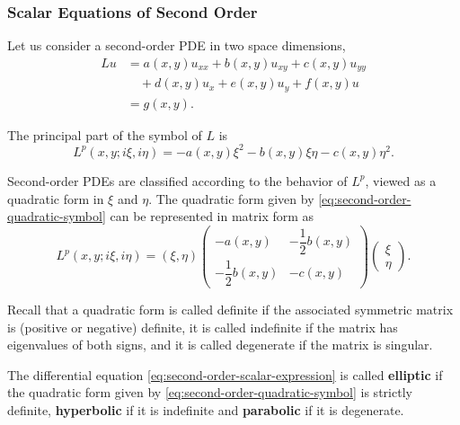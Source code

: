 \subsubsection{Scalar Equations of Second Order}\label{subsec:second-order-scalar-equations}

Let us consider a second-order PDE in two space dimensions,
\begin{equation}\label{eq:second-order-scalar-expression}
\begin{aligned}
Lu&=a(x,y)u_{xx}+b(x,y)u_{xy}+c(x,y)u_{yy}\\
&\quad+d(x,y)u_x+e(x,y)u_y+f(x,y)u\\
&=g(x,y).
\end{aligned}
\end{equation}


The principal part of the symbol of $L$ is
\begin{equation}\label{eq:second-order-quadratic-symbol}
L^p(x,y;i\xi,i\eta)=-a(x,y)\xi^2-b(x,y)\xi\eta-c(x,y)\eta^2.
\end{equation}


Second-order PDEs are classified according to the behavior of $L^p$, viewed as a quadratic form in $\xi$ and $\eta$. The quadratic form given by \eqref{eq:second-order-quadratic-symbol} can be represented in matrix form as
\begin{equation}\label{eq:second-order-symbol-matrix}
L^p(x,y;i\xi,i\eta)=(\xi,\eta)\begin{pmatrix}-a(x,y)&-\dfrac12b(x,y)\\-\dfrac12b(x,y)&-c(x,y)\end{pmatrix}\begin{pmatrix}\xi\\\eta\end{pmatrix}.
\end{equation}


Recall that a quadratic form is called definite if the associated symmetric matrix is (positive or negative) definite, it is called indefinite if the matrix has eigenvalues of both signs, and it is called degenerate if the matrix is singular.

\begin{Definition}
\label{def:second-order-scalar-type}
The differential equation \eqref{eq:second-order-scalar-expression} is called \textbf{elliptic} if the quadratic form given by \eqref{eq:second-order-quadratic-symbol} is strictly definite, \textbf{hyperbolic} if it is indefinite and \textbf{parabolic} if it is degenerate.
\end{Definition}

